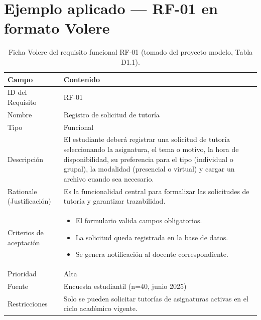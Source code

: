 \documentclass[11pt,a4paper]{article}
\begin{document}
\section*{Ejemplo aplicado --- RF-01 en formato Volere}

\begin{table}[htbp]
\centering
\caption{Ficha Volere del requisito funcional RF-01 (tomado del proyecto modelo, Tabla D1.1).}
\label{tab:rf01}
\begin{tabularx}{\textwidth}{L{3.7cm}X}
\toprule
{}
\textbf{Campo} & \textbf{Contenido}\\
\midrule
ID del Requisito             & RF-01\\
Nombre                       & Registro de solicitud de tutor\'ia\\
Tipo                         & Funcional\\
Descripci\'on                & El estudiante deber\'a registrar una solicitud de tutor\'ia
                               seleccionando la asignatura, el tema o motivo, la hora de
                               disponibilidad, su preferencia para el tipo (individual
                               o grupal), la modalidad (presencial o virtual) y cargar
                               un archivo cuando sea necesario.\\
Rationale (Justificaci\'on)  & Es la funcionalidad central para formalizar las solicitudes
                               de tutor\'ia y garantizar trazabilidad.\\
Criterios de aceptaci\'on    & \begin{itemize}[leftmargin=*,nosep]
                                 \item El formulario valida campos obligatorios.
                                 \item La solicitud queda registrada en la base de datos.
                                 \item Se genera notificaci\'on al docente correspondiente.
                               \end{itemize}\\
Prioridad                    & Alta\\
Fuente                       & Encuesta estudiantil (n=40, junio 2025)\\
Restricciones                & Solo se pueden solicitar tutor\'ias de asignaturas
                               activas en el ciclo acad\'emico vigente.\\

\end{tabularx}
\end{table}
\end{document}
